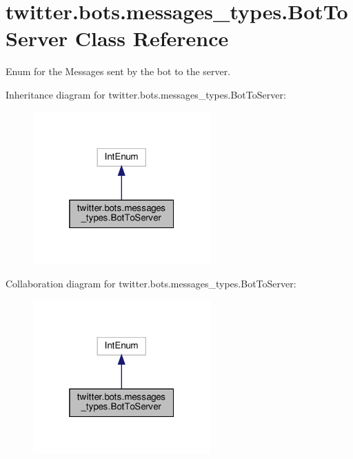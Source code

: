 \hypertarget{classtwitter_1_1bots_1_1messages__types_1_1BotToServer}{}\section{twitter.\+bots.\+messages\+\_\+types.\+Bot\+To\+Server Class Reference}
\label{classtwitter_1_1bots_1_1messages__types_1_1BotToServer}


Enum for the Messages sent by the bot to the server.  




Inheritance diagram for twitter.\+bots.\+messages\+\_\+types.\+Bot\+To\+Server\+:\nopagebreak
\begin{figure}[H]
\begin{center}
\leavevmode
\includegraphics[width=193pt]{d3/d94/classtwitter_1_1bots_1_1messages__types_1_1BotToServer__inherit__graph}
\end{center}
\end{figure}


Collaboration diagram for twitter.\+bots.\+messages\+\_\+types.\+Bot\+To\+Server\+:\nopagebreak
\begin{figure}[H]
\begin{center}
\leavevmode
\includegraphics[width=193pt]{d0/dad/classtwitter_1_1bots_1_1messages__types_1_1BotToServer__coll__graph}
\end{center}
\end{figure}
